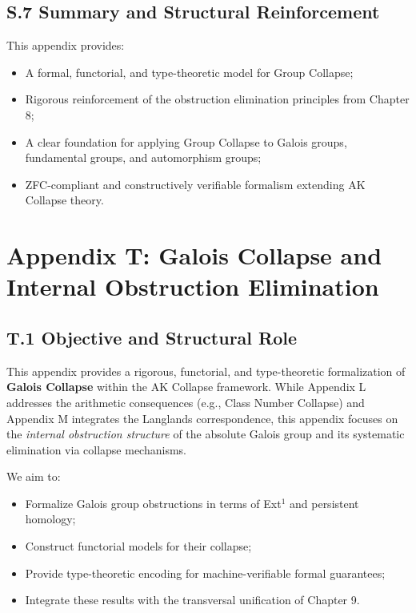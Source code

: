 \documentclass[11pt]{article}
\begin{document}
\subsection*{S.7 Summary and Structural Reinforcement}

This appendix provides:

\begin{itemize}
    \item A formal, functorial, and type-theoretic model for Group Collapse;
    \item Rigorous reinforcement of the obstruction elimination principles from Chapter 8;
    \item A clear foundation for applying Group Collapse to Galois groups, fundamental groups, and automorphism groups;
    \item ZFC-compliant and constructively verifiable formalism extending AK Collapse theory.
\end{itemize}




\section*{Appendix T: Galois Collapse and Internal Obstruction Elimination}

\subsection*{T.1 Objective and Structural Role}

This appendix provides a rigorous, functorial, and type-theoretic formalization of \textbf{Galois Collapse} within the AK Collapse framework. While Appendix L addresses the arithmetic consequences (e.g., Class Number Collapse) and Appendix M integrates the Langlands correspondence, this appendix focuses on the \emph{internal obstruction structure} of the absolute Galois group and its systematic elimination via collapse mechanisms.

We aim to:
\begin{itemize}
    \item Formalize Galois group obstructions in terms of Ext$^1$ and persistent homology;
    \item Construct functorial models for their collapse;
    \item Provide type-theoretic encoding for machine-verifiable formal guarantees;
    \item Integrate these results with the transversal unification of Chapter 9.
\end{itemize}
\end{document}
